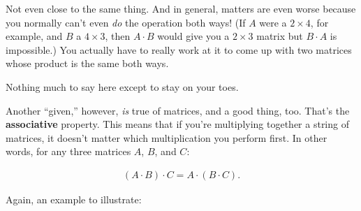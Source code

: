Not even close to the same thing. And in general, matters are even worse
because you normally can't even \textit{do} the operation both ways! (If $A$
were a $2\times 4$, for example, and $B$ a $4\times 3$, then $A \cdot B$ would
give you a $2\times 3$ matrix but $B \cdot A$ is impossible.) You actually have
to really work at it to come up with two matrices whose product is the same
both ways.

Nothing much to say here except to stay on your toes.

Another ``given,'' however, \textit{is} true of matrices, and a good thing,
too. That's the \textbf{associative} property. This means that if you're
multiplying together a string of matrices, it doesn't matter which
multiplication you perform first. In other words, for any three matrices $A$,
$B$, and $C$:

\vspace{-.15in}
\begin{align*}
(A \cdot B) \cdot C =
A \cdot (B \cdot C).
\end{align*}
\vspace{-.15in}

Again, an example to illustrate:


